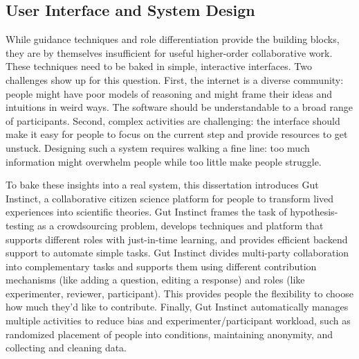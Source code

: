 


\subsection{User Interface and System Design}

While guidance techniques and role differentiation provide the building blocks, they are by themselves insufficient for useful higher-order collaborative work. These techniques need to be baked in simple, interactive interfaces. Two challenges show up for this question. First, the internet is a diverse community: people might have poor models of reasoning and might frame their ideas and intuitions in weird ways. The software should be understandable to a broad range of participants. Second, complex activities are challenging: the interface should make it easy for people to focus on the current step and provide resources to get unstuck. Designing such a system requires walking a fine line: too much information might overwhelm people while too little make people struggle.

To bake these insights into a real system, this dissertation introduces Gut Instinct, a collaborative citizen science platform for people to transform lived experiences into scientific theories. Gut Instinct frames the task of hypothesis-testing as a crowdsourcing problem, develops techniques and platform that supports different roles with just-in-time learning, and provides efficient backend support to automate simple tasks. Gut Instinct divides multi-party collaboration into complementary tasks and supports them using different contribution mechanisms (like adding a question, editing a response) and roles (like experimenter, reviewer, participant). This provides people the flexibility to choose how much they’d like to contribute. Finally, Gut Instinct automatically manages multiple activities to reduce 
bias and experimenter/participant workload, such as randomized placement of  people into conditions, maintaining anonymity, and collecting and cleaning data.

